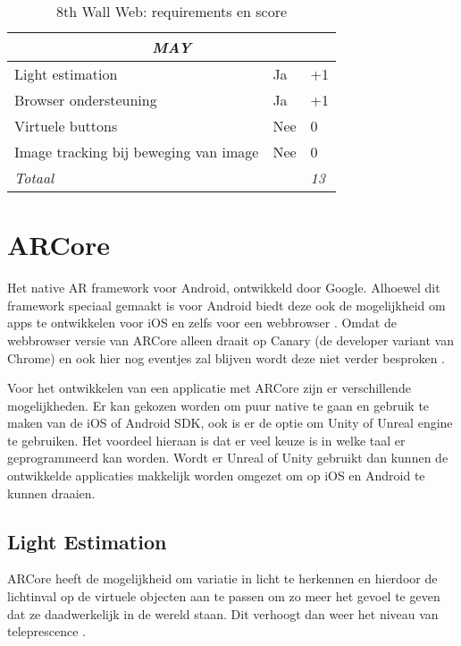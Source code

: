\begin{table}[]
\begin{tabular}{@{}lll@{}}
        \multicolumn{3}{c}{\textit{MAY}}                                                                 \\ \midrule
        Light estimation                           & Ja                                 & +1             \\
        Browser ondersteuning                      & Ja                                 & +1             \\
        Virtuele buttons                           & Nee                                & 0              \\
        Image tracking bij beweging van image      & Nee                                & 0              \\ \midrule
        \textit{Totaal}                            & \multicolumn{1}{r}{}               & \textit{13}    \\ \bottomrule
    \end{tabular}
\caption{8th Wall Web: requirements en score}
\label{tbl:8threq}
\end{table}

\section{ARCore}
Het native AR framework voor Android, ontwikkeld door Google. Alhoewel dit framework speciaal gemaakt is voor Android biedt deze ook de mogelijkheid om apps te ontwikkelen voor iOS en zelfs voor een webbrowser \autocite{ARCoreOverview}. Omdat de webbrowser versie van ARCore alleen draait op Canary (de developer variant van Chrome) en ook hier nog eventjes zal blijven wordt deze niet verder besproken \autocite{ARCoreWeb}.

Voor het ontwikkelen van een applicatie met ARCore zijn er verschillende mogelijkheden. Er kan gekozen worden om puur native te gaan en gebruik te maken van de iOS of Android SDK, ook is er de optie om Unity of Unreal engine te gebruiken. Het voordeel hieraan is dat er veel keuze is in welke taal er geprogrammeerd kan worden. Wordt er Unreal of Unity gebruikt dan kunnen de ontwikkelde applicaties makkelijk worden omgezet om op iOS en Android te kunnen draaien. 

\subsection{Light Estimation}
ARCore heeft de mogelijkheid om variatie in licht te herkennen en hierdoor de lichtinval op de virtuele objecten aan te passen om zo meer het gevoel te geven dat ze daadwerkelijk in de wereld staan. Dit verhoogt dan weer het niveau van teleprescence \autocite{ARCoreConcepts}.

